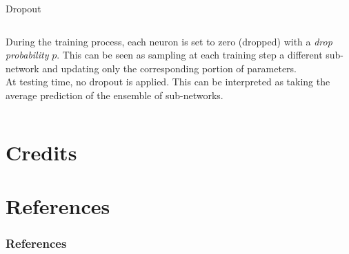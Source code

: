 \documentclass[aspectratio=169]{beamer}
\begin{document}
\begin{frame}{Dropout}
\begin{columns}
\begin{column}{0.7\textwidth}
\vspace{0.5cm}
During the training process, each neuron is set to zero (dropped) with a \emph{drop probability} $p$. This can be seen as sampling at each training step a different sub-network and updating only the corresponding portion of parameters.\\
\vspace{0.5cm}
At testing time, no dropout is applied. This can be interpreted as taking the average prediction of the ensemble of sub-networks.
\end{column}
\end{columns}
\end{frame}



\section{Credits}



\section{References}

\begin{frame}[t, allowframebreaks]
\frametitle{References}


\end{frame}
\end{document}
